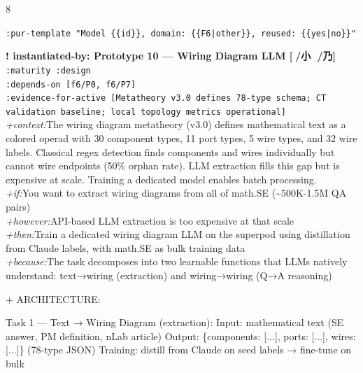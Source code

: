 \documentclass[landscape]{article}
\newcommand{\flexitag}[1]{\textcolor[gray]{0.35}{\textit{#1}}}
\newenvironment{devmapgreenfield}{%
  \def\FrameCommand{\colorbox{devmapgreenfieldbg}}%
  \setlength{\fboxsep}{2pt}%
  \MakeFramed{\advance\hsize-\width \FrameRestore}%
}{\endMakeFramed}
\begin{document}
\begin{paracol}{8}
\begin{devmapgreenfield}
  \texttt{:\allowbreak{}pur-\allowbreak{}template "Model \{\{id\}\},\allowbreak{} domain:\allowbreak{} \{\{F6|\allowbreak{}other\}\},\allowbreak{} reused:\allowbreak{} \{\{yes|\allowbreak{}no\}\}"}\\
\par
\par
\end{devmapgreenfield}
\textbf{! instantiated-by: Prototype 10 — Wiring Diagram LLM [🔸/小 🐲/乃]}\\
  \texttt{:\allowbreak{}maturity :\allowbreak{}design}\\
  \texttt{:\allowbreak{}depends-\allowbreak{}on [f6/\allowbreak{}P0,\allowbreak{} f6/\allowbreak{}P7]}\\
  \texttt{:\allowbreak{}evidence-\allowbreak{}for-\allowbreak{}active [Metatheory v3.0 defines 78-\allowbreak{}type schema;\allowbreak{} CT validation baseline;\allowbreak{} local topology metrics operational]}\\
  \flexitag{+context:}The wiring diagram metatheory (v3.0) defines mathematical text as a\\
    colored operad with 30 component types, 11 port types, 5 wire types, and 32 wire labels. Classical regex detection finds components and wires individually but cannot wire endpoints (50\% orphan rate). LLM extraction fills this gap but is expensive at scale. Training a dedicated model enables batch processing.\\
  \flexitag{+if:}You want to extract wiring diagrams from all of math.SE (\textasciitilde{}500K-1.5M QA pairs)\\
  \flexitag{+however:}API-based LLM extraction is too expensive at that scale\\
  \flexitag{+then:}Train a dedicated wiring diagram LLM on the superpod using distillation\\
    from Claude labels, with math.SE as bulk training data\\
  \flexitag{+because:}The task decomposes into two learnable functions that LLMs natively\\
    understand: text→wiring (extraction) and wiring→wiring (Q→A reasoning)\\
\par
  + ARCHITECTURE:\\
\par
    Task 1 — Text → Wiring Diagram (extraction): Input: mathematical text (SE answer, PM definition, nLab article) Output: \{components: [...], ports: [...], wires: [...]\} (78-type JSON) Training: distill from Claude on seed labels → fine-tune on bulk\\

\end{paracol}
\end{document}
